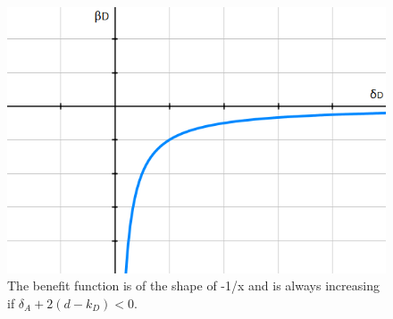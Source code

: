 \begin{figure}
\centering
\includegraphics[scale=0.5]{Images/ShapeDown.png} 
\caption{The benefit function is of the shape of -1/x and is always increasing if $\delta_{A} + 2(d-k_{D}) < 0$.}
\label{ShapeDown}
\end{figure}
%
~~\\

